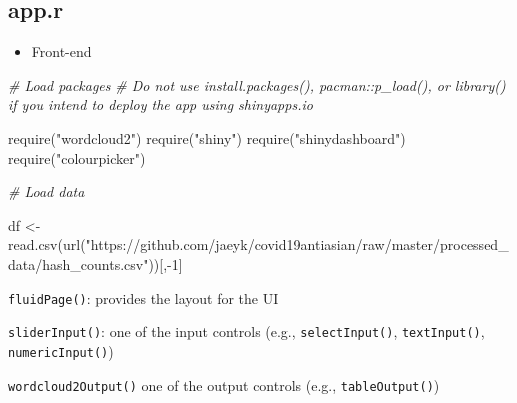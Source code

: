 \documentclass[
]{book}
\newenvironment{Shaded}{\begin{snugshade}}{\end{snugshade}}
\newcommand{\CommentTok}[1]{\textcolor[rgb]{0.56,0.35,0.01}{\textit{#1}}}
\newcommand{\DecValTok}[1]{\textcolor[rgb]{0.00,0.00,0.81}{#1}}
\newcommand{\FunctionTok}[1]{\textcolor[rgb]{0.00,0.00,0.00}{#1}}
\newcommand{\NormalTok}[1]{#1}
\newcommand{\OtherTok}[1]{\textcolor[rgb]{0.56,0.35,0.01}{#1}}
\newcommand{\SpecialCharTok}[1]{\textcolor[rgb]{0.00,0.00,0.00}{#1}}
\newcommand{\StringTok}[1]{\textcolor[rgb]{0.31,0.60,0.02}{#1}}
\providecommand{\tightlist}{%
  \setlength{\itemsep}{0pt}\setlength{\parskip}{0pt}}
\begin{document}
\hypertarget{app.r}{%
\subsection{app.r}\label{app.r}}

\begin{itemize}
\tightlist
\item
  Front-end
\end{itemize}

\begin{Shaded}
\begin{Highlighting}[]
\CommentTok{\# Load packages }
\CommentTok{\# Do not use install.packages(), pacman::p\_load(), or library() if you intend to deploy the app using shinyapps.io }

\FunctionTok{require}\NormalTok{(}\StringTok{"wordcloud2"}\NormalTok{)}
\FunctionTok{require}\NormalTok{(}\StringTok{"shiny"}\NormalTok{)}
\FunctionTok{require}\NormalTok{(}\StringTok{"shinydashboard"}\NormalTok{)}
\FunctionTok{require}\NormalTok{(}\StringTok{"colourpicker"}\NormalTok{)}
\end{Highlighting}
\end{Shaded}

\begin{Shaded}
\begin{Highlighting}[]
\CommentTok{\# Load data }

\NormalTok{df }\OtherTok{\textless{}{-}} \FunctionTok{read.csv}\NormalTok{(}\FunctionTok{url}\NormalTok{(}\StringTok{"https://github.com/jaeyk/covid19antiasian/raw/master/processed\_data/hash\_counts.csv"}\NormalTok{))[,}\SpecialCharTok{{-}}\DecValTok{1}\NormalTok{]}
\end{Highlighting}
\end{Shaded}

\texttt{fluidPage()}: provides the layout for the UI

\texttt{sliderInput()}: one of the input controls (e.g., \texttt{selectInput()}, \texttt{textInput()}, \texttt{numericInput()})

\texttt{wordcloud2Output()} one of the output controls (e.g., \texttt{tableOutput()})
\end{document}
